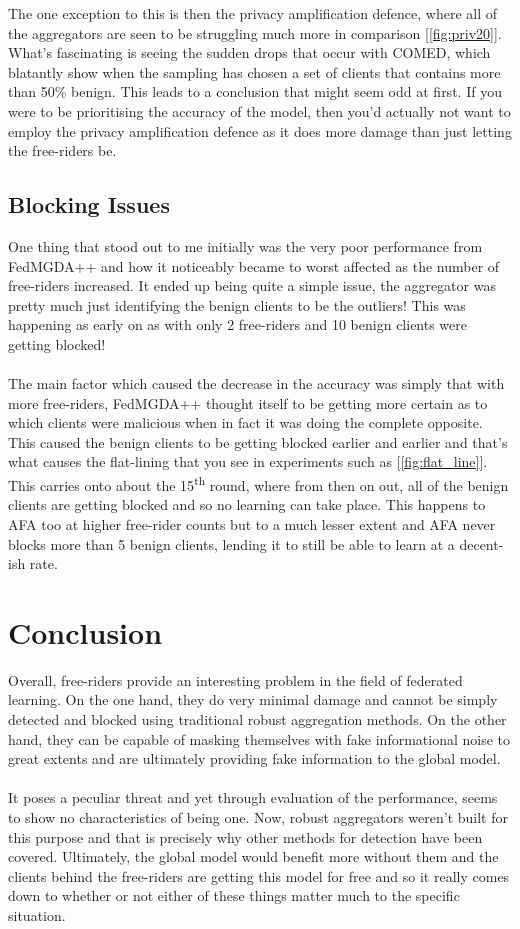 The one exception to this is then the privacy amplification defence, where all of the aggregators are seen to be struggling much more in comparison [\ref{fig:priv20}].
What's fascinating is seeing the sudden drops that occur with COMED, which blatantly show when the sampling has chosen a set of clients that contains more than 50\% benign.
This leads to a conclusion that might seem odd at first.
If you were to be prioritising the accuracy of the model, then you'd actually not want to employ the privacy amplification defence as it does more damage than just letting the free-riders be.
\newpage %


\subsection{Blocking Issues}
One thing that stood out to me initially was the very poor performance from FedMGDA++ and how it noticeably became to worst affected as the number of free-riders increased.
It ended up being quite a simple issue, the aggregator was pretty much just identifying the benign clients to be the outliers!
This was happening as early on as with only 2 free-riders and 10 benign clients were getting blocked!
\\ \\
The main factor which caused the decrease in the accuracy was simply that with more free-riders, FedMGDA++ thought itself to be getting more certain as to which clients were malicious when in fact it was doing the complete opposite.
This caused the benign clients to be getting blocked earlier and earlier and that's what causes the flat-lining that you see in experiments such as [\ref{fig:flat_line}].
This carries onto about the 15\textsuperscript{th} round, where from then on out, all of the benign clients are getting blocked and so no learning can take place.
This happens to AFA too at higher free-rider counts but to a much lesser extent and AFA never blocks more than 5 benign clients, lending it to still be able to learn at a decent-ish rate.


\section{Conclusion}
Overall, free-riders provide an interesting problem in the field of federated learning.
On the one hand, they do very minimal damage and cannot be simply detected and blocked using traditional robust aggregation methods.
On the other hand, they can be capable of masking themselves with fake informational noise to great extents and are ultimately providing fake information to the global model.
\\ \\
It poses a peculiar threat and yet through evaluation of the performance, seems to show no characteristics of being one.
Now, robust aggregators weren't built for this purpose and that is precisely why other methods for detection have been covered.
Ultimately, the global model would benefit more without them and the clients behind the free-riders are getting this model for free and so it really comes down to whether or not either of these things matter much to the specific situation.
